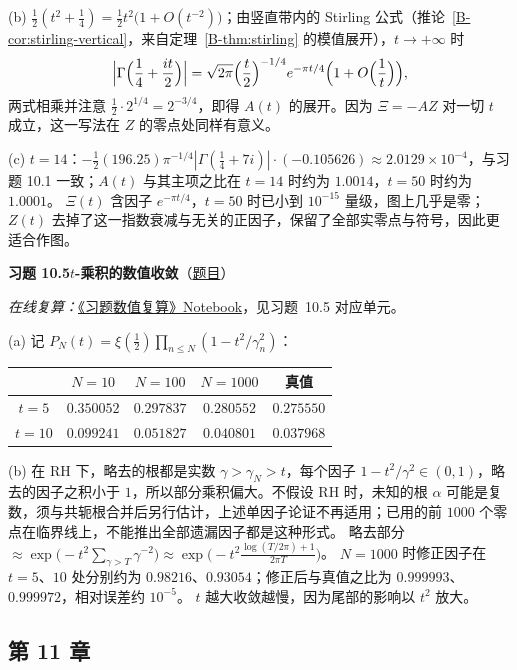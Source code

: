 \documentclass[11pt,a4paper]{article}
\newcommand{\bref}[1]{\ref*{B-#1}}
\newcommand{\Sol}[2]{%
  \par\addvspace{1.2em}\noindent
  \hypertarget{s:#1}{}\textbf{习题 #1\quad #2}\hfill{\small（\hyperlink{q:#1}{题目}）}\par
  \nopagebreak\smallskip}
\begin{document}
(b) $\frac12(t^2+\frac14)=\frac12t^2\bigl(1+O(t^{-2})\bigr)$；由竖直带内的 Stirling 公式（推论~\bref{cor:stirling-vertical}，来自定理~\bref{thm:stirling} 的模值展开），$t\to+\infty$ 时
\[
  \Bigl|\Gamma\Bigl(\frac14+\frac{it}2\Bigr)\Bigr|
  =\sqrt{2\pi}\Bigl(\frac t2\Bigr)^{-1/4}e^{-\pi t/4}\Bigl(1+O\Bigl(\frac1t\Bigr)\Bigr),
\]
两式相乘并注意 $\frac12\cdot2^{1/4}=2^{-3/4}$，即得 $A(t)$ 的展开。因为 $\Xi=-AZ$ 对一切 $t$ 成立，这一写法在 $Z$ 的零点处同样有意义。

(c) $t=14$：$-\frac12(196.25)\pi^{-1/4}|\Gamma(\frac14+7i)|\cdot(-0.105626)\approx2.0129\times10^{-4}$，与习题 10.1 一致；$A(t)$ 与其主项之比在 $t=14$ 时约为 $1.0014$，$t=50$ 时约为 $1.0001$。
$\Xi(t)$ 含因子 $e^{-\pi t/4}$，$t=50$ 时已小到 $10^{-15}$ 量级，图上几乎是零；$Z(t)$ 去掉了这一指数衰减与无关的正因子，保留了全部实零点与符号，因此更适合作图。

\Sol{10.5}{$t$-乘积的数值收敛}
\emph{在线复算：}\href{https://colab.research.google.com/github/lichengtong123/lichengtong-RH/blob/main/\%E4\%B9\%A0\%E9\%A2\%98\%E4\%B8\%8E\%E8\%A7\%A3\%E7\%AD\%94/\%E4\%B9\%A0\%E9\%A2\%98\%E6\%95\%B0\%E5\%80\%BC\%E5\%A4\%8D\%E7\%AE\%97.ipynb}{《习题数值复算》Notebook}，见习题~10.5 对应单元。

(a) 记 $P_N(t)=\xi(\frac12)\prod_{n\le N}(1-t^2/\gamma_n^2)$：
\begin{center}
\small
\begin{tabular}{@{}ccccc@{}}
\toprule
 & $N=10$ & $N=100$ & $N=1000$ & 真值 \\
\midrule
$t=5$ & $0.350052$ & $0.297837$ & $0.280552$ & $0.275550$ \\
$t=10$ & $0.099241$ & $0.051827$ & $0.040801$ & $0.037968$ \\
\bottomrule
\end{tabular}
\end{center}

(b) 在 RH 下，略去的根都是实数 $\gamma>\gamma_N>t$，每个因子 $1-t^2/\gamma^2\in(0,1)$，略去的因子之积小于 $1$，所以部分乘积偏大。不假设 RH 时，未知的根 $\alpha$ 可能是复数，须与共轭根合并后另行估计，上述单因子论证不再适用；已用的前 $1000$ 个零点在临界线上，不能推出全部遗漏因子都是这种形式。
略去部分 $\approx\exp\bigl(-t^2\sum_{\gamma>T}\gamma^{-2}\bigr)\approx\exp\bigl(-t^2\frac{\log(T/2\pi)+1}{2\pi T}\bigr)$。
$N=1000$ 时修正因子在 $t=5$、$10$ 处分别约为 $0.98216$、$0.93054$；修正后与真值之比为 $0.999993$、$0.999972$，相对误差约 $10^{-5}$。
$t$ 越大收敛越慢，因为尾部的影响以 $t^2$ 放大。

\subsection*{第 11 章}
\end{document}
